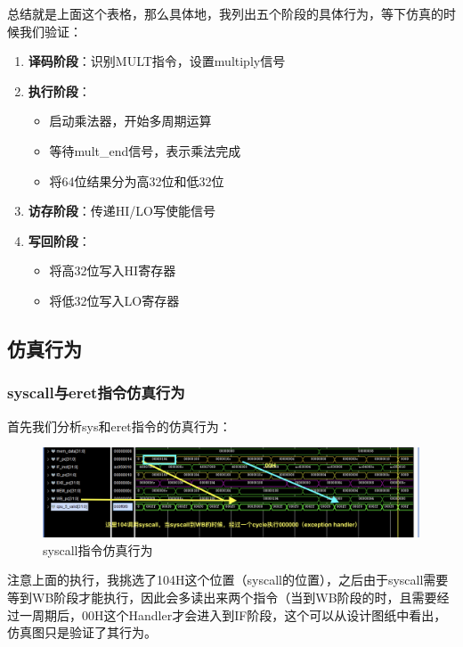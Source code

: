 \documentclass[a4paper]{article}
\begin{document}
总结就是上面这个表格，那么具体地，我列出五个阶段的具体行为，等下仿真的时候我们验证：

\begin{enumerate}
    \item \textbf{译码阶段}：识别MULT指令，设置multiply信号
    \item \textbf{执行阶段}：
    \begin{itemize}
        \item 启动乘法器，开始多周期运算
        \item 等待mult\_end信号，表示乘法完成
        \item 将64位结果分为高32位和低32位
    \end{itemize}
    \item \textbf{访存阶段}：传递HI/LO写使能信号
    \item \textbf{写回阶段}：
    \begin{itemize}
        \item 将高32位写入HI寄存器
        \item 将低32位写入LO寄存器
    \end{itemize}
\end{enumerate}

\subsection{仿真行为}

\subsubsection{syscall与eret指令仿真行为}
首先我们分析sys和eret指令的仿真行为：

\begin{figure}[H]
    \centering
    \includegraphics[width=\textwidth]{img/复现流水线仿真/syscall指令分析.png}
    \caption{syscall指令仿真行为}
\end{figure}

注意上面的执行，我挑选了104H这个位置（syscall的位置），之后由于syscall需要等到WB阶段才能执行，因此会多读出来两个指令（当到WB阶段的时，且需要经过一周期后，00H这个Handler才会进入到IF阶段，这个可以从设计图纸中看出，仿真图只是验证了其行为。
\end{document}
